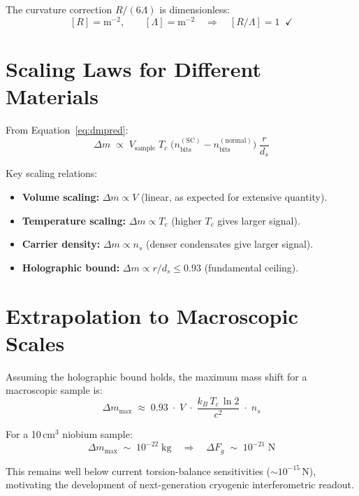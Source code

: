\documentclass[11pt,a4paper]{article}
\theoremstyle{remark}
\begin{document}
The curvature correction $R/(6\Lambda)$ is dimensionless:
\[
    [R] = \text{m}^{-2}, \qquad [\Lambda] = \text{m}^{-2}
    \quad\Longrightarrow\quad [R/\Lambda] = 1 \;\;\checkmark
\]

\section{Scaling Laws for Different Materials}
\label{sec:scaling}

From Equation~\eqref{eq:dmpred}:
\begin{equation}\label{eq:scaling}
    \Delta m \;\propto\; V_{\text{sample}}\; T_c\;
        \bigl(n_{\text{bits}}^{(\text{SC})} - n_{\text{bits}}^{(\text{normal})}\bigr)\;
        \frac{r}{d_s}
\end{equation}

Key scaling relations:
\begin{itemize}[nosep]
    \item \textbf{Volume scaling:} $\Delta m \propto V$ (linear, as expected for extensive quantity).
    \item \textbf{Temperature scaling:} $\Delta m \propto T_c$ (higher $T_c$ gives larger signal).
    \item \textbf{Carrier density:} $\Delta m \propto n_s$ (denser condensates give larger signal).
    \item \textbf{Holographic bound:} $\Delta m \propto r/d_s \leq 0.93$ (fundamental ceiling).
\end{itemize}

\section{Extrapolation to Macroscopic Scales}
\label{sec:macro}

Assuming the holographic bound holds, the maximum mass shift for a macroscopic sample is:
\begin{equation}\label{eq:macro}
    \Delta m_{\text{max}} \;\approx\; 0.93\;\cdot\; V\;\cdot\;
        \frac{k_B\, T_c\,\ln 2}{c^2}\;\cdot\; n_s
\end{equation}

For a 10\,cm$^3$ niobium sample:
\[
    \Delta m_{\text{max}} \;\sim\; 10^{-22}\;\text{kg}
    \quad\Longrightarrow\quad
    \Delta F_g \;\sim\; 10^{-21}\;\text{N}
\]

This remains well below current torsion-balance sensitivities ($\sim 10^{-15}$\,N), motivating the development of next-generation cryogenic interferometric readout.
\end{document}
